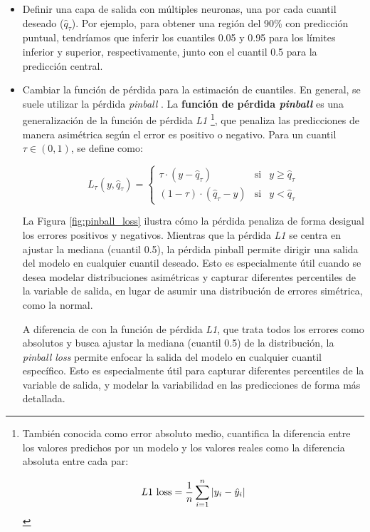 \begin{itemize}

    \item Definir una capa de salida con múltiples neuronas, una por cada cuantil deseado ($\hat{q}_\tau$). Por ejemplo, para obtener una región del 90\% con predicción puntual, tendríamos que inferir los cuantiles 0.05 y 0.95 para los límites inferior y superior, respectivamente, junto con el cuantil 0.5 para la predicción central.

    \item Cambiar la función de pérdida para la estimación de cuantiles. En general, se suele utilizar la pérdida \textit{pinball} \cite{steinwart2011}. La \textbf{función de pérdida \textit{pinball}} es una generalización de la función de pérdida \textit{L1}%
    \footnote{
        También conocida como error absoluto medio, cuantifica la diferencia entre los valores predichos por un modelo y los valores reales como la diferencia absoluta entre cada par:
        
        $$
        L1\textnormal{ loss} = \frac{1}{n} \sum_{i=1}^n |y_i-\hat{y}_i|
        $$
    }, 
    que penaliza las predicciones de manera asimétrica según el error es positivo o negativo. Para un cuantil $\tau \in \left( 0,1\right)$, se define como:

    $$
    L_\tau(y,\hat{q}_\tau) = \left\{
        \begin{array}{rcl}
            \tau \cdot (y-\hat{q}_\tau) & \mbox{si} & y \ge \hat{q}_\tau
            \\
            (1-\tau) \cdot (\hat{q}_\tau-y) & \mbox{si} & y < \hat{q}_\tau
        \end{array}
    \right.
    $$

    La Figura \ref{fig:pinball_loss} ilustra cómo la pérdida penaliza de forma desigual los errores positivos y negativos. Mientras que la pérdida \textit{L1} se centra en ajustar la mediana (cuantil 0.5), la pérdida pinball permite dirigir una salida del modelo en cualquier cuantil deseado. Esto es especialmente útil cuando se desea modelar distribuciones asimétricas y capturar diferentes percentiles de la variable de salida, en lugar de asumir una distribución de errores simétrica, como la normal.
    
    A diferencia de con la función de pérdida \textit{L1}, que trata todos los errores como absolutos y busca ajustar la mediana (cuantil 0.5) de la distribución, la \textit{pinball loss} permite enfocar la salida del modelo en cualquier cuantil específico. Esto es especialmente útil para capturar diferentes percentiles de la variable de salida, y modelar la variabilidad en las predicciones de forma más detallada.


\end{itemize}
